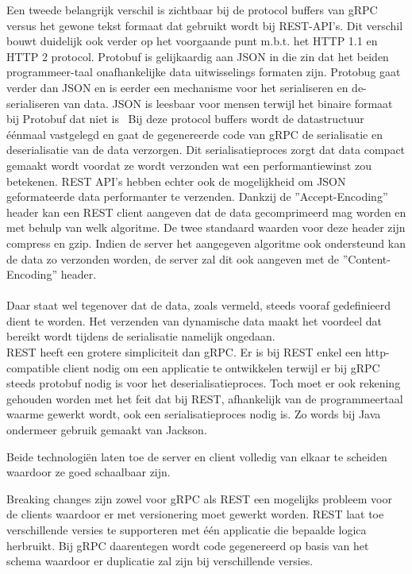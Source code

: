 Een tweede belangrijk verschil is zichtbaar bij de protocol buffers van gRPC versus het gewone tekst formaat dat gebruikt wordt bij REST-API's.
Dit verschil bouwt duidelijk ook verder op het voorgaande punt m.b.t. het HTTP 1.1 en HTTP 2 protocol.
Protobuf is gelijkaardig aan JSON in die zin dat het beiden programmeer-taal onafhankelijke data uitwisselings formaten zijn.
Protobug gaat verder dan JSON en is eerder een mechanisme voor het serialiseren en de-serialiseren van data.
JSON is leesbaar voor mensen terwijl het binaire formaat bij Protobuf dat niet is~\parencite{json}
Bij deze protocol buffers wordt de datastructuur \'e\'enmaal vastgelegd en gaat de gegenereerde code van gRPC de serialisatie en deserialisatie van de data verzorgen.
Dit serialisatieproces zorgt dat data compact gemaakt wordt voordat ze wordt verzonden wat een performantiewinst zou betekenen.\newline
REST API's hebben echter ook de mogelijkheid om JSON geformateerde data performanter te verzenden. Dankzij de ''Accept-Encoding'' header kan een REST client aangeven
dat de data gecomprimeerd mag worden en met behulp van welk algoritme. De twee standaard waarden voor deze header zijn compress en gzip. Indien de server het aangegeven algoritme
ook ondersteund kan de data zo verzonden worden, de server zal dit ook aangeven met de ''Content-Encoding'' header.
~\autocite{googleprotobufguide}\\
~\autocite{restcompression}\\

Daar staat wel tegenover dat de data, zoals vermeld, steeds vooraf gedefinieerd dient te worden.
Het verzenden van dynamische data maakt het voordeel dat bereikt wordt tijdens de serialisatie namelijk ongedaan.\\

REST heeft een grotere simpliciteit dan gRPC. Er is bij REST enkel een http-compatible client nodig om een applicatie te ontwikkelen terwijl
er bij gRPC steeds protobuf nodig is voor het deserialisatieproces. Toch moet er ook rekening gehouden worden met het feit dat bij REST,
afhankelijk van de programmeertaal waarme gewerkt wordt, ook een serialisatieproces nodig is. Zo words bij Java ondermeer gebruik gemaakt van Jackson.\newline
~\autocite{jackson}

Beide technologi\"en laten toe de server en client volledig van elkaar te scheiden waardoor ze goed schaalbaar zijn.

Breaking changes zijn zowel voor gRPC als REST een mogelijks probleem voor de clients waardoor er met versionering moet gewerkt worden.
REST laat toe verschillende versies te supporteren met \'e\'en applicatie die bepaalde logica herbruikt. Bij gRPC daarentegen wordt code gegenereerd op basis van
het schema waardoor er duplicatie zal zijn bij verschillende versies.\newline
~\autocite{grpcversion}

